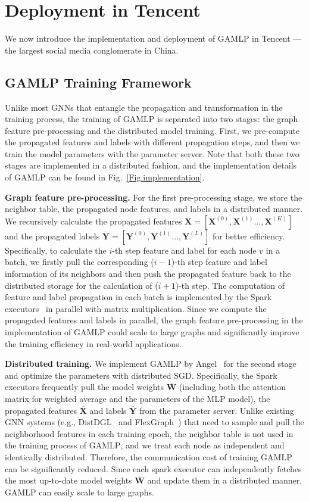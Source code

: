 \documentclass[sigconf]{acmart}
\newcommand{\sys}{\textsc{GAMLP}\xspace}
\begin{document}
\section{Deployment in Tencent}
We now introduce the implementation and deployment
of \sys in Tencent --- the largest social media conglomerate in China. 

\subsection{\sys Training Framework}
Unlike most GNNs that entangle the propagation and transformation in the training process, the training of \sys is separated into two stages: the graph feature pre-processing and the distributed model training.  
First, we pre-compute the propagated features and labels with different propagation steps, and then we train the model parameters with the parameter server. 
Note that both these two stages are implemented in a distributed fashion, and the implementation details of \sys can be found in Fig.~\ref{Fig.implementation}.

\noindent\textbf{Graph feature pre-processing.}
For the first pre-processing stage, we store the neighbor table, the propagated node features, and labels in a distributed manner. We recursively calculate the propagated features $\overline{\mathbf{X}} = [\mathbf{X}^{(0)},\mathbf{X}^{(1)} ..., \mathbf{X}^{(K)}]$ and the propagated labels $\overline{\mathbf{Y}} = [\mathbf{Y}^{(0)},\mathbf{Y}^{(1)} ..., \mathbf{Y}^{(L)}]$ for better efficiency. Specifically, to calculate the $i$-th step feature and label for each node $v$ in a batch, we firstly pull the corresponding ($i-1$)-th step feature and label information of its neighbors and then push the propagated feature back to the distributed storage for the calculation of ($i+1$)-th step. The computation of feature and label propagation in each batch is implemented by the Spark executors~\cite{zaharia2010spark} in parallel with matrix multiplication.
Since we compute the propagated features and labels in parallel, the graph feature pre-processing in the implementation of \sys could scale to large graphs and significantly improve the training efficiency in real-world applications.

\noindent\textbf{Distributed training.}
We implement \sys by Angel~\cite{jiang2020psgraph} for the second stage and optimize the parameters with distributed SGD. Specifically, the Spark executors frequently pull the model weights $\overline{\mathbf{W}}$ (including both the attention matrix for weighted average and the parameters of the MLP model), the propagated features $\overline{\mathbf{X}}$ and labels $\overline{\mathbf{Y}}$ from the parameter server.
Unlike existing GNN systems 
(e.g., DistDGL~\cite{distdgl_ai3_2020} and FlexGraph~\cite{wang2021flexgraph}) that need to sample and pull the neighborhood features in each training epoch, the neighbor table is not used in the training process of \sys, and we treat each node as independent and identically distributed. Therefore, the communication cost of training \sys can be significantly reduced. Since each spark executor can independently fetches the most up-to-date model weights $\overline{\mathbf{W}}$ and update them in a distributed manner, \sys can easily scale to large graphs.
\end{document}
